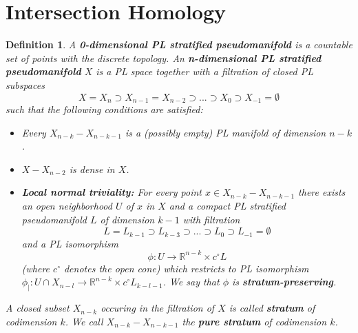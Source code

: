\documentclass{scrreprt}
\newtheorem{definition}[prop]{Definition}
\begin{document}
\section{Intersection Homology}

\begin{definition}
A \textbf{0-dimensional PL stratified pseudomanifold} is a countable set of points with the discrete topology. An \textbf{n-dimensional PL stratified pseudomanifold} $X$ is a PL space together with a filtration of closed PL subspaces
\begin{equation*}
X=X_n \supset X_{n-1} = X_{n-2} \supset ... \supset X_0 \supset X_{-1} = \emptyset
\end{equation*}
such that the following conditions are satisfied:
\begin{itemize}
\item Every $X_{n-k} - X_{n-k-1}$ is a (possibly empty) PL manifold of dimension $n-k$.
\item $X-X_{n-2}$ is dense in $X$.
\item \textbf{Local normal triviality:} For every point $x \in X_{n-k} - X_{n-k-1}$ there exists an open neighborhood $U$ of $x$  in $X$ and a compact PL stratified pseudomanifold $L$ of dimension $k-1$ with filtration
\begin{equation*}
L = L_{k-1} \supset L_{k-3} \supset ... \supset L_0 \supset L_{-1}= \emptyset
\end{equation*}
and a PL isomorphism
\begin{equation*}
\phi : U \to \mathbb{R}^{n-k} \times c^{\circ} L
\end{equation*}
(where $c^{\circ}$ denotes the open cone) which restricts to PL isomorphism $\phi_| : U \cap X_{n-l} \to \mathbb{R}^{n-k} \times c^{\circ} L_{k-l-1}$. We say that $\phi$ is \textbf{stratum-preserving}.
\end{itemize}
A closed subset $X_{n-k}$ occuring in the filtration of $X$ is called \textbf{stratum} of codimension $k$. We call $X_{n-k}-X_{n-k-1}$ the \textbf{pure stratum} of codimension $k$.
\end{definition}
\end{document}
